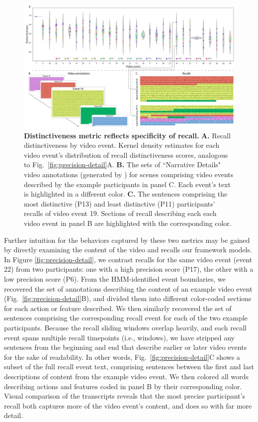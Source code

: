 \documentclass{article}
\begin{document}
\begin{figure}[t]
  \centering
  \includegraphics[width=1\textwidth]{figs/distinctiveness_detail}
  \caption{\small \textbf{Distinctiveness metric reflects specificity of recall.} \textbf{A.} Recall distinctiveness by video event.  Kernel density estimates for each video event's distribution of recall distinctiveness scores, analogous to Fig.~\ref{fig:precision-detail}A.  \textbf{B.} The sets of ``Narrative Details" video annotations (generated by \citealp{ChenEtal17}) for scenes comprising video events described by the example participants in panel C.  Each event's text is highlighted in a different color.  \textbf{C.} The sentences comprising the most distinctive (P13) and least distinctive (P11) participants' recalls of video event 19.  Sections of recall describing each each video event in panel B are highlighted with the corresponding color.}
  \label{fig:distinctiveness-detail}
\end{figure}

Further intuition for the behaviors captured by these two metrics may be gained by directly examining the content of the video and recalls our framework models.  In Figure \ref{fig:precision-detail}, we contrast recalls for the same video event (event 22) from two participants: one with a high precision score (P17), the other with a low precision score (P6).  From the HMM-identified event boundaries, we recovered the set of annotations describing the content of an example video event (Fig.~\ref{fig:precision-detail}B), and divided them into different color-coded sections for each action or feature described.  We then similarly recovered the set of sentences comprising the corresponding recall event for each of the two example participants.  Because the recall sliding windows overlap heavily, and each recall event spans multiple recall timepoints (i.e., windows), we have stripped any sentences from the beginning and end that describe earlier or later video events for the sake of readability.  In other words, Fig.~\ref{fig:precision-detail}C shows a subset of the full recall event text, comprising sentences between the first and last descriptions of content from the example video event.  We then colored all words describing actions and features coded in panel B by their corresponding color.  Visual comparison of the transcripts reveals that the most precise participant's recall both captures more of the video event's content, and does so with far more detail.
\end{document}
